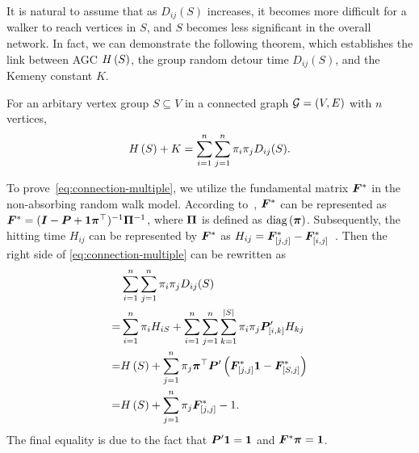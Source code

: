 \documentclass[10pt,journal,compsoc,twocolumn,twoside]{IEEEtran}
\begin{document}
It is natural to assume that as \(D_{ij}(S)\) increases, it becomes more difficult for a walker to reach vertices in \(S\), and \(S\) becomes less significant in the overall network. In fact, we can demonstrate the following theorem, which establishes the link between AGC \(H\left(S\right)\), the group random detour time \(D_{ij}(S)\), and the Kemeny constant \(K\).

\begin{theorem}\label{thm:connection-multiple}
    For an arbitary vertex group \(S\subseteq V\) in a connected graph \(\mathcal{G}=(V,E)\) with \(n\) vertices,
    \begin{equation}\label{eq:connection-multiple}
        H\left(S\right)+K=\sum_{i=1}^n\sum_{j=1}^n\pi_i\pi_jD_{ij}(S).
    \end{equation}
\end{theorem}
\begin{IEEEproof}
    To prove~\eqref{eq:connection-multiple}, we utilize the fundamental matrix \(\boldsymbol{F}^*\) in the non-absorbing random walk model.
    According to~\cite{BoRaZh11}, \(\boldsymbol{F}^*\) can be represented as \(\boldsymbol{F}^*=(\boldsymbol{I}-\boldsymbol{P}+\boldsymbol{1}\boldsymbol{\pi}^\top)^{-1}\boldsymbol{\Pi}^{-1}\), where \(\boldsymbol{\Pi}\) is defined as \(\rm{diag}\left( \boldsymbol{\pi} \right)\).
    Subsequently, the hitting time \(H_{ij}\) can be represented by \(\boldsymbol{F}^*\) as \(H_{ij}=\boldsymbol{F}^*_{[j,j]}-\boldsymbol{F}^*_{[i,j]}\)~\cite{BoRaZh11}.
    Then the right side of \eqref{eq:connection-multiple} can be rewritten as
    \begin{equation}\label{eq:detour}
        \begin{split}
            &\sum_{i=1}^n\sum_{j=1}^n\pi_i\pi_jD_{ij}(S)\\
            =&\sum_{i=1}^n\pi_i H_{iS}+\sum_{i=1}^n\sum_{j=1}^n\sum_{k=1}^{\left|S \right|}\pi_i\pi_j\boldsymbol{P}'_{[i,k]}H_{kj}  \\
            =&H\left(S\right)+\sum_{j=1}^n\pi_j\boldsymbol{\pi}^\top\boldsymbol{P}'\left( \boldsymbol{F}^*_{[j,j]}\boldsymbol{1}-\boldsymbol{F}^*_{[S,j]} \right)                        \\
            =&H\left(S\right)+\sum_{j=1}^n\pi_j\boldsymbol{F}^*_{[j,j]}-1.
        \end{split}
    \end{equation}
    The final equality is due to the fact that \(\boldsymbol{P}'\boldsymbol{1}=\boldsymbol{1}\) and \(\boldsymbol{F}^*\boldsymbol{\pi}=\boldsymbol{1}\).


\end{IEEEproof}
\end{document}
